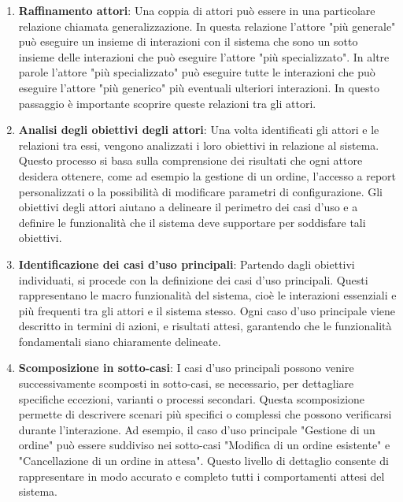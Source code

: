 \begin{enumerate}
    \item \textbf{Raffinamento attori}: Una coppia di attori può essere in una particolare relazione chiamata generalizzazione.
    In questa relazione l'attore "più generale" può eseguire un insieme di interazioni con il sistema che sono un sotto insieme delle interazioni che può eseguire l'attore "più specializzato".
    In altre parole l'attore "più specializzato" può eseguire tutte le interazioni che può eseguire l'attore "più generico" più eventuali ulteriori interazioni.
    In questo passaggio è importante scoprire queste relazioni tra gli attori.

    \item \textbf{Analisi degli obiettivi degli attori}: Una volta identificati gli attori e le relazioni tra essi, vengono analizzati i loro obiettivi in relazione al sistema. 
    Questo processo si basa sulla comprensione dei risultati che ogni attore desidera ottenere, come ad esempio la gestione di un ordine, l'accesso a report personalizzati o la possibilità di modificare parametri di configurazione.
    Gli obiettivi degli attori aiutano a delineare il perimetro dei casi d'uso e a definire le funzionalità che il sistema deve supportare per soddisfare tali obiettivi.

    \item \textbf{Identificazione dei casi d'uso principali}: Partendo dagli obiettivi individuati, si procede con la definizione dei casi d'uso principali. Questi rappresentano le macro funzionalità del sistema, cioè le interazioni essenziali e più frequenti tra gli attori e il sistema stesso. Ogni caso d'uso principale viene descritto in termini di azioni, e risultati attesi, garantendo che le funzionalità fondamentali siano chiaramente delineate.
    
    \item \textbf{Scomposizione in sotto-casi}: I casi d'uso principali possono venire successivamente scomposti in sotto-casi, se necessario, per dettagliare specifiche eccezioni, varianti o processi secondari. Questa scomposizione permette di descrivere scenari più specifici o complessi che possono verificarsi durante l'interazione. Ad esempio, il caso d'uso principale "Gestione di un ordine" può essere suddiviso nei sotto-casi "Modifica di un ordine esistente" e "Cancellazione di un ordine in attesa". Questo livello di dettaglio consente di rappresentare in modo accurato e completo tutti i comportamenti attesi del sistema.

\end{enumerate}